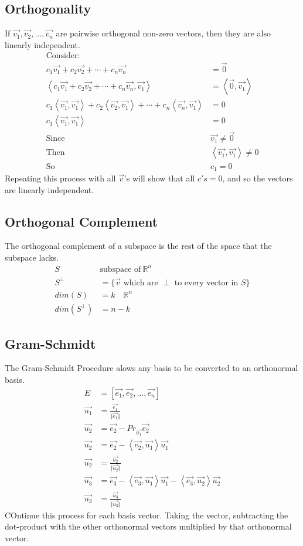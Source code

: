\documentclass[12pt]{article}
\begin{document}
\subsection{Orthogonality}
If $\vec{v_1}, \vec{v_2},\ldots,\vec{v_n}$ are pairwise orthogonal non-zero vectors, then they are also linearly independent.
\begin{align}
  \text{Consider:}&\\
  c_1\vec{v_1} + c_2\vec{v_2} + \cdots + c_n\vec{v_n} &= \vec{0}\\
  \left< c_1\vec{v_1} + c_2\vec{v_2} + \cdots + c_n\vec{v_n} , \vec{v_1} \right> &= \left< \vec{0}, \vec{v_1}\right>\\
  c_1\left<\vec{v_1},\vec{v_1}\right> + c_2\left<\vec{v_2},\vec{v_1}\right> + \cdots + c_n\left<\vec{v_n}, \vec{v_1}\right> &=0\\
  c_1\left<\vec{v_1},\vec{v_1}\right> &= 0\\
  \text{Since}\ &\vec{v_1}\neq\vec{0}\\
  \text{Then}\ &\left<\vec{v_1},\vec{v_1}\right>\neq 0\\
  \text{So}\ &c_1 = 0
\end{align}
Repeating this process with all $\vec{v}$'s will show that all $c's=0$, and so the vectors are linearly independent.
\subsection{Orthogonal Complement}
The orthogonal complement of a subspace is the rest of the space that the subspace lacks.
\begin{align}
  S\ &\text{subspace of}\ \mathbb{R}^n\\
  S^\perp &= \{ \vec{v} \text{ which are } \perp \text{ to every vector in } S \}\\
  dim(S) &= k\quad\mathbb{R}^n\\
  dim(S^\perp) &= n-k
\end{align}
\subsection{Gram-Schmidt}
The Gram-Schmidt Procedure alows any basis to be converted to an orthonormal basis.
\begin{align}
  E\ &= \left[\vec{e_1}, \vec{e_2}, \ldots,\vec{e_n}\right]\\
  \vec{u_1} &= \frac{\vec{e_1}}{\Vert\vec{e_1}\Vert}\\
  \vec{u_2} &= \vec{e_2} - Pr_{\vec{u_1}}\vec{e_2}\\
  \vec{u_2} &= \vec{e_2} - \left<\vec{e_2},\vec{u_1}\right>\vec{u_1}\\
  \vec{u_2} &= \frac{\vec{u_2}}{\Vert\vec{u_2}\Vert}\\
  \vec{u_3} &= \vec{e_3} - \left<\vec{e_3},\vec{u_1}\right>\vec{u_1} - \left<\vec{e_3},\vec{u_2}\right>\vec{u_2}\\
  \vec{u_3} &= \frac{\vec{u_3}}{\Vert\vec{u_3}\Vert}
\end{align}
COntinue this process for each basis vector. Taking the vector, subtracting the dot-product with the other orthonormal vectors multiplied by that orthonormal vector.
\end{document}
